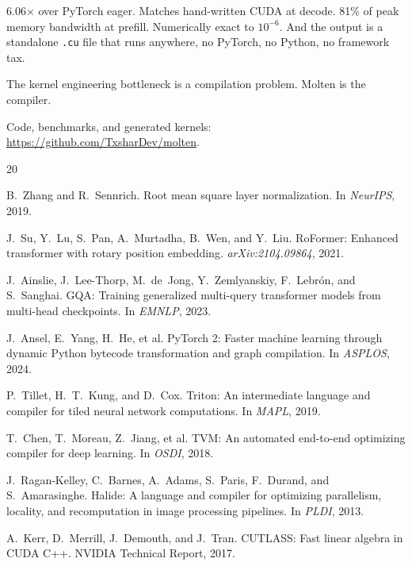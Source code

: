 \documentclass[11pt,a4paper]{article}
\begin{document}
6.06$\times$ over PyTorch eager. Matches hand-written CUDA at decode.
81\% of peak memory bandwidth at prefill. Numerically exact to $10^{-6}$.
And the output is a standalone \texttt{.cu} file that runs anywhere, no
PyTorch, no Python, no framework tax.

The kernel engineering bottleneck is a compilation problem. Molten is the compiler.

Code, benchmarks, and generated kernels:
\url{https://github.com/TxsharDev/molten}.


\begin{thebibliography}{20}

B.~Zhang and R.~Sennrich.
\newblock Root mean square layer normalization.
\newblock In \emph{NeurIPS}, 2019.

J.~Su, Y.~Lu, S.~Pan, A.~Murtadha, B.~Wen, and Y.~Liu.
\newblock RoFormer: Enhanced transformer with rotary position embedding.
\newblock \emph{arXiv:2104.09864}, 2021.

J.~Ainslie, J.~Lee-Thorp, M.~de~Jong, Y.~Zemlyanskiy, F.~Lebr\'{o}n, and S.~Sanghai.
\newblock GQA: Training generalized multi-query transformer models from multi-head checkpoints.
\newblock In \emph{EMNLP}, 2023.

J.~Ansel, E.~Yang, H.~He, et al.
\newblock PyTorch 2: Faster machine learning through dynamic Python bytecode transformation and graph compilation.
\newblock In \emph{ASPLOS}, 2024.

P.~Tillet, H.~T.~Kung, and D.~Cox.
\newblock Triton: An intermediate language and compiler for tiled neural network computations.
\newblock In \emph{MAPL}, 2019.

T.~Chen, T.~Moreau, Z.~Jiang, et al.
\newblock TVM: An automated end-to-end optimizing compiler for deep learning.
\newblock In \emph{OSDI}, 2018.

J.~Ragan-Kelley, C.~Barnes, A.~Adams, S.~Paris, F.~Durand, and S.~Amarasinghe.
\newblock Halide: A language and compiler for optimizing parallelism, locality, and recomputation in image processing pipelines.
\newblock In \emph{PLDI}, 2013.

A.~Kerr, D.~Merrill, J.~Demouth, and J.~Tran.
\newblock CUTLASS: Fast linear algebra in CUDA C++.
\newblock NVIDIA Technical Report, 2017.


\end{thebibliography}
\end{document}
